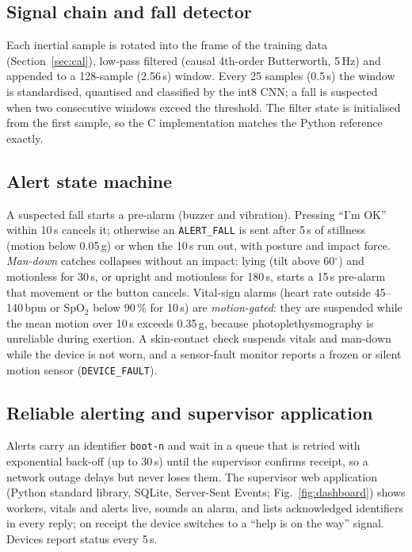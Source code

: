 \documentclass[conference]{IEEEtran}
\begin{document}
\subsection{Signal chain and fall detector}
Each inertial sample is rotated into the frame of the training data (Section~\ref{sec:cal}),
low-pass filtered (causal 4th-order Butterworth, 5\,Hz) and appended to a 128-sample
(2.56\,s) window. Every 25 samples (0.5\,s) the window is standardised, quantised and
classified by the int8 CNN; a fall is suspected when two consecutive windows exceed the
threshold. The filter state is initialised from the first sample, so the C implementation
matches the Python reference exactly.

\subsection{Alert state machine}
A suspected fall starts a pre-alarm (buzzer and vibration). Pressing ``I'm OK'' within
10\,s cancels it; otherwise an \texttt{ALERT\_FALL} is sent after 5\,s of stillness (motion
below 0.05\,g) or when the 10\,s run out, with posture and impact force. \emph{Man-down}
catches collapses without an impact: lying (tilt above 60$^\circ$) and motionless for
30\,s, or upright and motionless for 180\,s, starts a 15\,s pre-alarm that movement or the
button cancels. Vital-sign alarms (heart rate outside 45--140\,bpm or SpO$_2$ below
90\,\% for 10\,s) are \emph{motion-gated}: they are suspended while the mean motion over
10\,s exceeds 0.35\,g, because photoplethysmography is unreliable during exertion. A
skin-contact check suspends vitals and man-down while the device is not worn, and a
sensor-fault monitor reports a frozen or silent motion sensor (\texttt{DEVICE\_FAULT}).

\subsection{Reliable alerting and supervisor application}
Alerts carry an identifier \texttt{boot-n} and wait in a queue that is retried with
exponential back-off (up to 30\,s) until the supervisor confirms receipt, so a network
outage delays but never loses them. The supervisor web application (Python standard
library, SQLite, Server-Sent Events; Fig.~\ref{fig:dashboard}) shows workers, vitals and
alerts live, sounds an alarm, and lists acknowledged identifiers in every reply; on receipt
the device switches to a ``help is on the way'' signal. Devices report status every 5\,s.
\end{document}
